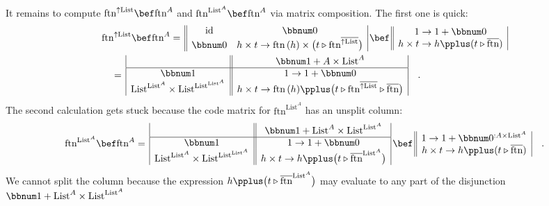 It remains to compute $\text{ftn}^{\uparrow\text{List}}\bef\text{ftn}^{A}$
and $\text{ftn}^{\text{List}^{A}}\bef\text{ftn}^{A}$ via matrix composition.
The first one is quick:
\begin{align*}
 & \text{ftn}^{\uparrow\text{List}}\bef\text{ftn}^{A}=\,\begin{array}{||cc|}
\text{id} & \bbnum 0\\
\bbnum 0 & h\times t\rightarrow\text{ftn}\,(h)\times\big(t\triangleright\text{ftn}^{\overline{\uparrow\text{List}}}\big)
\end{array}\,\bef\,\begin{array}{||c|}
1\rightarrow1+\bbnum 0\\
h\times t\rightarrow h\pplus(t\triangleright\overline{\text{ftn}})
\end{array}\\
 & \quad=\,\begin{array}{|c||c|}
 & \bbnum 1+A\times\text{List}^{A}\\
\hline \bbnum 1 & 1\rightarrow1+\bbnum 0\\
\text{List}^{\text{List}^{A}}\times\text{List}^{\text{List}^{\text{List}^{A}}} & h\times t\rightarrow\text{ftn}\,(h)\pplus\big(t\triangleright\text{ftn}^{\overline{\uparrow\text{List}}}\triangleright\overline{\text{ftn}}\big)
\end{array}\quad.
\end{align*}
The second calculation gets stuck because the code matrix for $\text{ftn}^{\text{List}^{A}}$
has an unsplit column:
\[
\text{ftn}^{\text{List}^{A}}\bef\text{ftn}^{A}=\,\begin{array}{|c||c|}
 & \bbnum 1+\text{List}^{A}\times\text{List}^{\text{List}^{A}}\\
\hline \bbnum 1 & 1\rightarrow1+\bbnum 0\\
\text{List}^{\text{List}^{A}}\times\text{List}^{\text{List}^{\text{List}^{A}}} & h\times t\rightarrow h\pplus\big(t\triangleright\overline{\text{ftn}}^{\text{List}^{A}}\big)
\end{array}\,\bef\,\begin{array}{||c|}
1\rightarrow1+\bbnum 0^{:A\times\text{List}^{A}}\\
h\times t\rightarrow h\pplus(t\triangleright\overline{\text{ftn}})
\end{array}\quad.
\]
We cannot split the column because the expression $h\pplus\big(t\triangleright\overline{\text{ftn}}^{\text{List}^{A}}\big)$
may evaluate to any part of the disjunction $\bbnum 1+\text{List}^{A}\times\text{List}^{\text{List}^{A}}$
